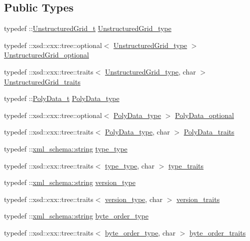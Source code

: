 \subsection*{Public Types}
\begin{DoxyCompactItemize}
\item 
typedef \+::\hyperlink{classUnstructuredGrid__t}{Unstructured\+Grid\+\_\+t} \hyperlink{classVTKFile__t_a34ea02f6804e701657f11a8dc3851951}{Unstructured\+Grid\+\_\+type}
\item 
typedef \+::xsd\+::cxx\+::tree\+::optional$<$ \hyperlink{classVTKFile__t_a34ea02f6804e701657f11a8dc3851951}{Unstructured\+Grid\+\_\+type} $>$ \hyperlink{classVTKFile__t_ada5bb5a706e03ef1ab2ed1513ea83833}{Unstructured\+Grid\+\_\+optional}
\item 
typedef \+::xsd\+::cxx\+::tree\+::traits$<$ \hyperlink{classVTKFile__t_a34ea02f6804e701657f11a8dc3851951}{Unstructured\+Grid\+\_\+type}, char $>$ \hyperlink{classVTKFile__t_a02772a5f713678f02e94188d6a552528}{Unstructured\+Grid\+\_\+traits}
\item 
typedef \+::\hyperlink{classPolyData__t}{Poly\+Data\+\_\+t} \hyperlink{classVTKFile__t_a4588b4f0e28ba09aa219bda7e1fc6c97}{Poly\+Data\+\_\+type}
\item 
typedef \+::xsd\+::cxx\+::tree\+::optional$<$ \hyperlink{classVTKFile__t_a4588b4f0e28ba09aa219bda7e1fc6c97}{Poly\+Data\+\_\+type} $>$ \hyperlink{classVTKFile__t_aacb796775ae228cd61726a23b809f3e4}{Poly\+Data\+\_\+optional}
\item 
typedef \+::xsd\+::cxx\+::tree\+::traits$<$ \hyperlink{classVTKFile__t_a4588b4f0e28ba09aa219bda7e1fc6c97}{Poly\+Data\+\_\+type}, char $>$ \hyperlink{classVTKFile__t_aa5ad98f5709c1e9beec3804a7f42b5f6}{Poly\+Data\+\_\+traits}
\item 
typedef \+::\hyperlink{namespacexml__schema_ac0cec83a330f0024e4e318b3deac5104}{xml\+\_\+schema\+::string} \hyperlink{classVTKFile__t_ac1f3484e4fde414849ede43a00955f76}{type\+\_\+type}
\item 
typedef \+::xsd\+::cxx\+::tree\+::traits$<$ \hyperlink{classVTKFile__t_ac1f3484e4fde414849ede43a00955f76}{type\+\_\+type}, char $>$ \hyperlink{classVTKFile__t_aee4ac167e843e9def1be4f43ad930391}{type\+\_\+traits}
\item 
typedef \+::\hyperlink{namespacexml__schema_ac0cec83a330f0024e4e318b3deac5104}{xml\+\_\+schema\+::string} \hyperlink{classVTKFile__t_a7db6f6d11f363380d6361446f5dede7b}{version\+\_\+type}
\item 
typedef \+::xsd\+::cxx\+::tree\+::traits$<$ \hyperlink{classVTKFile__t_a7db6f6d11f363380d6361446f5dede7b}{version\+\_\+type}, char $>$ \hyperlink{classVTKFile__t_a5a343e08417564e5db3f48859b1a0c5f}{version\+\_\+traits}
\item 
typedef \+::\hyperlink{namespacexml__schema_ac0cec83a330f0024e4e318b3deac5104}{xml\+\_\+schema\+::string} \hyperlink{classVTKFile__t_ab08dd45c560dd0635d0e5c0a5e42d2e8}{byte\+\_\+order\+\_\+type}
\item 
typedef \+::xsd\+::cxx\+::tree\+::traits$<$ \hyperlink{classVTKFile__t_ab08dd45c560dd0635d0e5c0a5e42d2e8}{byte\+\_\+order\+\_\+type}, char $>$ \hyperlink{classVTKFile__t_ae0b8c254bc373d9218ea9eab406b7b98}{byte\+\_\+order\+\_\+traits}
\end{DoxyCompactItemize}

